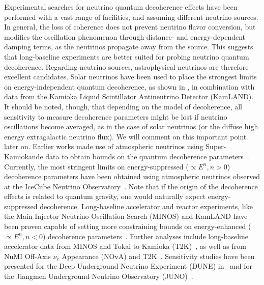 \documentclass[aps, prd, onecolumn, tightenlines, notitlepage, superscriptaddress, nofootinbib, preprintnumbers, floatfix,showkeys,11pt]{revtex4-2}
\begin{document}
Experimental searches for neutrino quantum decoherence effects have been performed with a vast range of facilities, and assuming different neutrino sources.  In general, the loss of coherence does not prevent neutrino flavor conversion, but modifies the oscillation phenomenon through distance- and energy-dependent damping terms, as the neutrinos propagate away from the source. This suggests that long-baseline experiments are better suited for probing neutrino quantum decoherence. 
%
Regarding neutrino sources, astrophysical neutrinos are therefore excellent candidates. Solar neutrinos have been used to place the strongest limits on energy-independent quantum decoherence, as shown in \cite{Fogli:2007tx,deHolanda:2019tuf}, in combination with data from the Kamioka Liquid Scintillator Antineutrino Detector (KamLAND). It should be noted, though, that depending on the model of decoherence, all sensitivity to measure decoherence parameters might be lost if neutrino oscillations become averaged, as in the case of solar neutrinos (or the diffuse high energy extragalactic neutrino flux). We will comment on this important point later on.
%
Earlier works made use of atmospheric neutrinos using Super-Kamiokande data to obtain bounds on the quantum decoherence parameters~\cite{Lisi:2000zt}. Currently, the most stringent limits on energy-suppressed ($\propto E^{n}, n>0$) decoherence parameters have been obtained using atmospheric neutrinos observed at the IceCube Neutrino Observatory~\cite{Coloma:2018idr}. Note that if the origin of the decoherence effects is related to quantum gravity, one would naturally expect energy-suppressed decoherence.
%
Long-baseline accelerator and reactor experiments, like the Main Injector Neutrino Oscillation Search (MINOS) and KamLAND have been proven capable of setting more constraining bounds on energy-enhanced ($\propto E^{n}, n<0$) decoherence parameters~\cite{deOliveira:2013dia,BalieiroGomes:2016ykp}. Further analyses include long-baseline accelerator data from MINOS and Tokai to Kamioka (T2K)~\cite{Gomes:2020muc}, as well as
from NuMI Off-Axis $\nu_e$ Appearance (NOvA) and T2K~\cite{Coelho:2017zes}. Sensitivity studies have been presented for the Deep Underground Neutrino Experiment (DUNE) in~\cite{BalieiroGomes:2018gtd,Carpio:2018gum} and for the Jiangmen Underground Neutrino Observatory (JUNO)~\cite{JUNO:2021ydg}.
\end{document}
